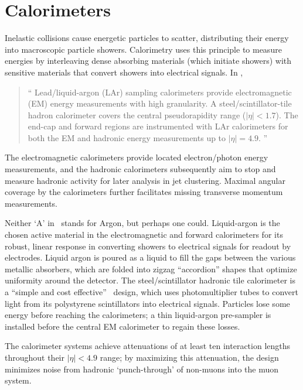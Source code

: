 \section{Calorimeters}
\label{sec:atlas_calo}
Inelastic collisions cause energetic particles to scatter, distributing their
energy into macroscopic particle showers.
Calorimetry uses this principle to measure energies
by interleaving dense absorbing materials (which initiate showers)
with sensitive materials that convert showers into electrical signals.
In \atlas,
\begin{quote}
``%
Lead/liquid-argon (LAr) sampling calorimeters provide electromagnetic (EM)
energy measurements with high granularity.
A steel/scintillator-tile hadron calorimeter covers the central pseudorapidity
range ($|\eta| < 1.7$).
The end-cap and forward regions are instrumented with LAr calorimeters for both
the EM and hadronic energy measurements up to $|\eta| = 4.9$.%
''~\cite{atlas2022searches}
\end{quote}
The electromagnetic calorimeters provide located electron/photon energy
measurements,
and the hadronic calorimeters subsequently aim to stop and measure hadronic
activity for later analysis in jet clustering.
Maximal angular coverage by the calorimeters further facilitates missing
transverse momentum measurements.

Neither `A' in \atlas\ stands for Argon, but perhaps one could.
Liquid-argon is the chosen active material in the electromagnetic and forward
calorimeters for its robust, linear response in converting showers to
electrical signals for readout by electrodes.
Liquid argon is poured as a liquid to fill the gaps between the various
metallic absorbers, which are folded into zigzag ``accordion'' shapes that
optimize uniformity around the detector.
The steel/scintillator hadronic tile calorimeter is a
``simple and cost effective''~\cite{atlas1996tile} design, which uses
photomultiplier tubes to convert light from its polystyrene scintillators into
electrical signals.
Particles lose some energy before reaching the calorimeters; a thin
liquid-argon pre-sampler is installed before the central EM calorimeter
to regain these losses.

The calorimeter systems achieve attenuations of at least ten interaction
lengths throughout their $|\eta| < 4.9$ range;
by maximizing this attenuation, the design minimizes noise from hadronic
`punch-through' of non-muons into the muon system.


